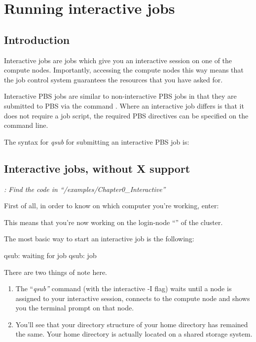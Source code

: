 \chapter{Running interactive jobs}

\section{Introduction}

Interactive jobs are jobs which give you an interactive session on one of the
compute nodes. Importantly, accessing the compute nodes this way means that the
job control system guarantees the resources that you have asked for.

Interactive PBS jobs are similar to non-interactive PBS jobs in that they are
submitted to PBS via the command . Where an interactive job
differs is that it does not require a job script, the required PBS directives
can be specified on the command line.

The syntax for \emph{qsub} for submitting an interactive PBS job is:
\begin{prompt}
\end{prompt}

\section{Interactive jobs, without X support}

\emph{: Find the code in
``\tilde/examples/Chapter0\_Interactive''}

First of all, in order to know on which computer you're working, enter:
\begin{prompt}
\end{prompt}

This means that you're now working on the login-node ``\emph{\loginnode}'' of
the \hpc cluster.

The most basic way to start an interactive job is the following:
\begin{prompt}
qsub: waiting for job %
qsub: job %
\end{prompt}

There are two things of note here.

\begin{enumerate}
  \item  The ``\emph{qsub''} command (with the interactive -I
      flag) waits until a node is assigned to your interactive session,
      connects to the compute node and shows you the terminal prompt on that
      node.
  \item  You'll see that your directory structure of your home directory has
      remained the same. Your home directory is actually located on a shared
      storage system.
\end{enumerate}

